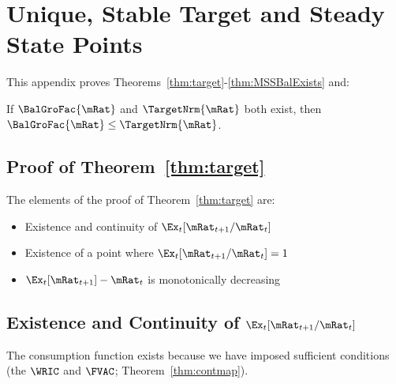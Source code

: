 \documentclass[\econtexRoot/BufferStockTheory]{subfiles}
\begin{document}

\hypertarget{ApndxMTargetIsStable}{}
\section{Unique, Stable Target and Steady State Points}\label{sec:ApndxMTargetIsStable}


This appendix proves Theorems~\ref{thm:target}-\ref{thm:MSSBalExists} and:
\onlyinsubfile{\setcounter{theorem}{1}}

  \begin{lemma}\label{lemma:orderingPartOne}
  If $\BalGroFac{\mRat}$ and $\TargetNrm{\mRat}$ both exist, then $\BalGroFac{\mRat} \leq \TargetNrm{\mRat}$.
  \end{lemma}

  \begin{comment}
  \begin{lemma}\label{lemma:orderingPartTwo}
  If $\BalGroFac{\mRat}$ and $\BalGroRte{\mRat}$ both exist, then $\BalGroFac{\mRat} \leq \BalGroRte{\mRat}$.
  \end{lemma}
\end{comment}

  \subsection{Proof of Theorem~\ref{thm:target}}
  
  The elements of the proof of Theorem~\ref{thm:target} are:
\begin{itemize}
\item Existence and continuity of $\Ex_t [{\mRat}_{t+1}/\mRat_t]$
\item Existence of a point where $\Ex_t [{\mRat}_{t+1}/\mRat_t] = 1$
\item $\Ex_t [{\mRat}_{t+1}]-\mRat_{t}$ is monotonically decreasing
\end{itemize}


\subsection{Existence and Continuity of
  \texorpdfstring{$\Ex_t [{\mRat}_{t+1}/\mRat_t]$}{Ex-{t}[mRat-{t+1}/mRat-{t}]}}\label{subsubsec:RatExitsCont}
The consumption function exists because we have imposed sufficient conditions (the $\WRIC$ and $\FVAC$; Theorem~\ref{thm:contmap}). %
\end{document}

